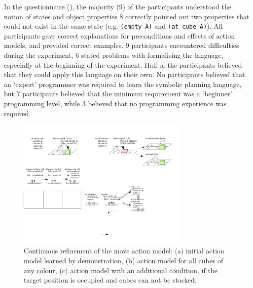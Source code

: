 In the questionnaire (), the majority (9) of the participants understood the notion of states and object properties
8 correctly pointed out two properties that could not exist in the same state (e.g. \texttt{(empty A)} and \texttt{(at cube A)}).
All participants gave correct explanations for preconditions and effects of action models, and provided correct examples.
9 participants encountered difficulties during the experiment, 6 stated problems with formalising the language, especially at the beginning of the experiment.
Half of the participants believed that they could apply this language on their own.
No participants believed that an `expert' programmer was required to learn the symbolic planning language, but 7 participants believed that the minimum requirement was a `beginner' programming level, while 3 believed that no programming experience was required.

 \begin{figure}[t]
  \centering
  \includegraphics[width=8.5cm]{figures/scenarios-exp2}
  \caption{Continuous refinement of the move action model: (a) initial action model learned by demonstration, (b) action model for all cubes of any colour, (c) action model with an additional condition, if the target position is occupied and cubes can not be stacked.}
  \label{fig:scenarios-exp2}
 \end{figure}